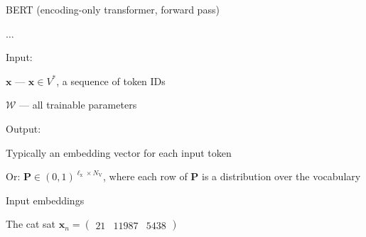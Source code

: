 \documentclass[12pt,aspectratio=169,handout]{beamer}
\begin{document}
\begin{frame}{BERT (encoding-only transformer, forward pass)}
	
	\begin{minipage}[t][3em][t]{15cm}
		\begin{algorithmic}[1]
			\State $\ldots$
			\EndFunction
		\end{algorithmic}
		
	\end{minipage}
	
Input:

$\bm{x}$ --- $\bm{x} \in V^*$, a sequence of token IDs

$\bm{\mathcal{W}}$ --- all trainable parameters

Output:

Typically an embedding vector for each input token

Or: $\bm{P} \in (0,1)^{\ell_{\text{x}} \times N_{\text{V}}}$, where each row of $\bm{P}$ is a distribution over the vocabulary

\end{frame}




\begin{frame}{Input embeddings}
	
	The cat sat $\bm{x}_n =
	\begin{pmatrix}
		21 &
		11987 &
		5438
	\end{pmatrix}$
	

\end{frame}	
\end{document}

